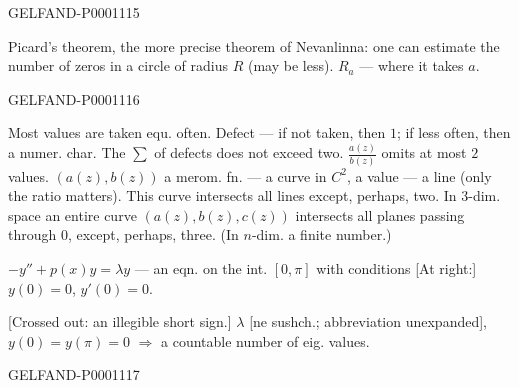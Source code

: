 \begin{GelfandAdjacentEvidence}{GELFAND-P000111}{5}

Picard's theorem, the more precise theorem of Nevanlinna:
one can estimate the number of zeros in a circle of radius $R$ (may be less).
$R_a$ — where it takes $a$.
\end{GelfandAdjacentEvidence}
\begin{GelfandAdjacentEvidence}{GELFAND-P000111}{6}

Most values are taken equ. often.
Defect — if not taken, then $1$; if less often, then a numer. char.
The $\sum$ of defects does not exceed two.
$\frac{a(z)}{b(z)}$ omits at most $2$ values.
$(a(z),b(z))$ a merom. fn. — a curve in $C^2$,
a value — a line (only the ratio matters).
This curve intersects all lines except, perhaps, two.
\noindent{} In $3$-dim. space an entire curve $(a(z),b(z),c(z))$
intersects all planes passing through $0$, except, perhaps, three.
(In $n$-dim. a finite number.)

\noindent{}
$-y''+p(x)y=\lambda y$ — an eqn. on the int. $[0,\pi]$ with conditions
[At right:] $y(0)=0$, $y'(0)=0$.


[Crossed out: an illegible short sign.]
$\lambda$ [ne sushch.; abbreviation unexpanded], $y(0)=y(\pi)=0$ $\Rightarrow$ a countable number of eig. values.
\end{GelfandAdjacentEvidence}
\begin{GelfandAdjacentEvidence}{GELFAND-P000111}{7}

\end{GelfandAdjacentEvidence}
